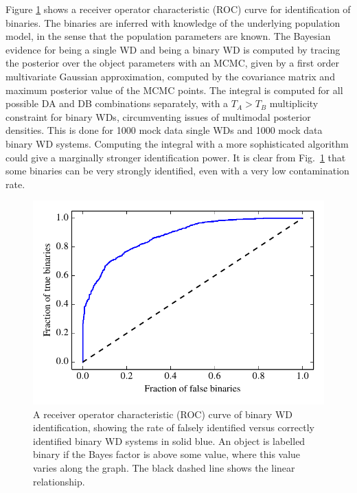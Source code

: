 \documentclass[fleqn,usenatbib]{mnras}
\newcommand{\Teff}{T}
\begin{document}
Figure \ref{fig:ROC_binaries} shows a receiver operator characteristic (ROC) curve for identification of binaries. The binaries are inferred with knowledge of the underlying population model, in the sense that the population parameters are known. The Bayesian evidence for being a single WD and being a binary WD is computed by tracing the posterior over the object parameters with an MCMC, given by a first order multivariate Gaussian approximation, computed by the covariance matrix and maximum posterior value of the MCMC points. The integral is computed for all possible DA and DB combinations separately, with a $\Teff_A>\Teff_B$ multiplicity constraint for binary WDs, circumventing issues of multimodal posterior densities. This is done for 1000 mock data single WDs and 1000 mock data binary WD systems. Computing the integral with a more sophisticated algorithm could give a marginally stronger identification power. It is clear from Fig.~\ref{fig:ROC_binaries} that some binaries can be very strongly identified, even with a very low contamination rate.
\begin{figure}
	\includegraphics[width=\columnwidth]{ROC_binaries.pdf}
    \caption{A receiver operator characteristic (ROC) curve of binary WD identification, showing the rate of falsely identified versus correctly identified binary WD systems in solid blue. An object is labelled binary if the Bayes factor is above some value, where this value varies along the graph. The black dashed line shows the linear relationship.}
    \label{fig:ROC_binaries}
\end{figure}
\end{document}
